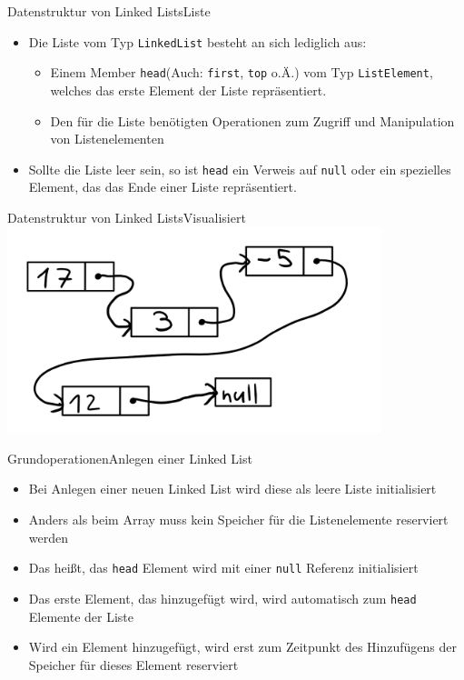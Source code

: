 \begin{frame}{Datenstruktur von Linked Lists}{Liste}
	\begin{itemize}
		\item Die Liste vom Typ \texttt{LinkedList} besteht an sich lediglich aus:
		\begin{itemize}
			\item Einem Member \texttt{head}(Auch: \texttt{first}, \texttt{top} o.Ä.) vom Typ \texttt{ListElement}, welches das erste Element der Liste repräsentiert.
			\item Den für die Liste benötigten Operationen zum Zugriff und Manipulation von Listenelementen
		\end{itemize}
		\item Sollte die Liste leer sein, so ist \texttt{head} ein Verweis auf \texttt{null} oder ein spezielles Element, das das Ende einer Liste repräsentiert.
	\end{itemize}
\end{frame}

\begin{frame}{Datenstruktur von Linked Lists}{Visualisiert}
\includegraphics[height=6cm]{graph/llist_basic}
\end{frame}

\begin{frame}{Grundoperationen}{Anlegen einer Linked List}
	\begin{itemize}
		\item Bei Anlegen einer neuen Linked List wird diese als leere Liste initialisiert
		\item Anders als beim Array muss kein Speicher für die Listenelemente reserviert werden
		\item Das heißt, das \texttt{head} Element wird mit einer \texttt{null} Referenz initialisiert
		\item Das erste Element, das hinzugefügt wird, wird automatisch zum \texttt{head} Elemente der Liste
		\item Wird ein Element hinzugefügt, wird erst zum Zeitpunkt des Hinzufügens der Speicher für dieses Element reserviert
	\end{itemize}
\end{frame}

